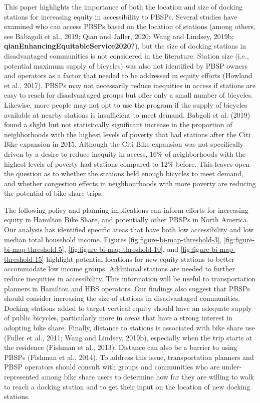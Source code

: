 \documentclass[]{elsarticle} %
\begin{document}
This paper highlights the importance of both the location and size of
docking stations for increasing equity in accessibility to PBSPs.
Several studies have examined who can access PBSPs based on the location
of stations (among others, see Babagoli et al., 2019; Qian and Jaller,
2020; Wang and Lindsey, 2019b;
\textbf{qianEnhancingEquitableService2020?}), but the size of docking
stations in disadvantaged communities is not considered in the
literature. Station size (i.e., potential maximum supply of bicycles)
was also not identified by PBSP owners and operators as a factor that
needed to be addressed in equity efforts (Howland et al., 2017). PBSPs
may not necessarily reduce inequities in access if stations are easy to
reach for disadvantaged groups but offer only a small number of
bicycles. Likewise, more people may not opt to use the program if the
supply of bicycles available at nearby stations is insufficient to meet
demand. Babgoli et al. (2019) found a slight but not statistically
significant increase in the proportion of neighborhoods with the highest
levels of poverty that had stations after the Citi Bike expansion in
2015. Although the Citi Bike expansion was not specifically driven by a
desire to reduce inequity in access, 16\% of neighborhoods with the
highest levels of poverty had stations compared to 12\% before. This
leaves open the question as to whether the stations held enough bicycles
to meet demand, and whether congestion effects in neighbourhoods with
more poverty are reducing the potential of bike share trips.

The following policy and planning implications can inform efforts for
increasing equity in Hamilton Bike Share, and potentially other PBSPs in
North America. Our analysis has identified specific areas that have both
low accessibility and low median total household income. Figures
\ref{fig:figure-bi-map-threshold-3},
\ref{fig:figure-bi-map-threshold-5},
\ref{fig:figure-bi-map-threshold-10}, and
\ref{fig:figure-bi-map-threshold-15} highlight potential locations for
new equity stations to better accommodate low income groups. Additional
stations are needed to further reduce inequities in accessibility. This
information will be useful to transportation planners in Hamilton and
HBS operators. Our findings also suggest that PBSPs should consider
increasing the size of stations in disadvantaged communities. Docking
stations added to target vertical equity should have an adequate supply
of public bicycles, particularly more in areas that have a strong
interest in adopting bike share. Finally, distance to stations is
associated with bike share use (Fuller et al., 2011; Wang and Lindsey,
2019b), especially when the trip starts at the residence (Fishman et
al., 2013). Distance can also be a barrier to using PBSPs (Fishman et
al., 2014). To address this issue, transportation planners and PBSP
operators should consult with groups and communities who are
under-represented among bike share users to determine how far they are
willing to walk to reach a docking station and to get their input on the
location of new docking stations.
\end{document}
